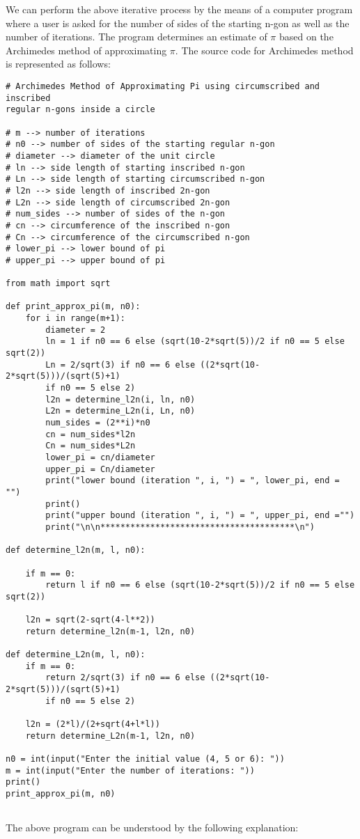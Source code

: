\documentclass[12pt]{article}
\begin{document}
We can perform the above iterative process by the means of a
computer program where a user is asked for the number of sides of the starting n-gon as well as the number of iterations. The program determines an
estimate of $\pi$ based on the Archimedes method of approximating $\pi$. The source
code for Archimedes method is represented as follows:

\begin{verbatim}
# Archimedes Method of Approximating Pi using circumscribed and inscribed
regular n-gons inside a circle

# m --> number of iterations
# n0 --> number of sides of the starting regular n-gon
# diameter --> diameter of the unit circle
# ln --> side length of starting inscribed n-gon
# Ln --> side length of starting circumscribed n-gon
# l2n --> side length of inscribed 2n-gon
# L2n --> side length of circumscribed 2n-gon
# num_sides --> number of sides of the n-gon
# cn --> circumference of the inscribed n-gon
# Cn --> circumference of the circumscribed n-gon
# lower_pi --> lower bound of pi
# upper_pi --> upper bound of pi

from math import sqrt

def print_approx_pi(m, n0):
    for i in range(m+1):
        diameter = 2
        ln = 1 if n0 == 6 else (sqrt(10-2*sqrt(5))/2 if n0 == 5 else sqrt(2))
        Ln = 2/sqrt(3) if n0 == 6 else ((2*sqrt(10-2*sqrt(5)))/(sqrt(5)+1)
        if n0 == 5 else 2)
        l2n = determine_l2n(i, ln, n0)
        L2n = determine_L2n(i, Ln, n0)
        num_sides = (2**i)*n0
        cn = num_sides*l2n
        Cn = num_sides*L2n
        lower_pi = cn/diameter
        upper_pi = Cn/diameter
        print("lower bound (iteration ", i, ") = ", lower_pi, end = "")
        print()
        print("upper bound (iteration ", i, ") = ", upper_pi, end ="")
        print("\n\n***************************************\n")
		
def determine_l2n(m, l, n0):

    if m == 0:
        return l if n0 == 6 else (sqrt(10-2*sqrt(5))/2 if n0 == 5 else sqrt(2))

    l2n = sqrt(2-sqrt(4-l**2))
    return determine_l2n(m-1, l2n, n0)
	
def determine_L2n(m, l, n0): 
    if m == 0:
        return 2/sqrt(3) if n0 == 6 else ((2*sqrt(10-2*sqrt(5)))/(sqrt(5)+1)
        if n0 == 5 else 2)
		
    l2n = (2*l)/(2+sqrt(4+l*l))
    return determine_L2n(m-1, l2n, n0)
	
n0 = int(input("Enter the initial value (4, 5 or 6): "))
m = int(input("Enter the number of iterations: "))
print()
print_approx_pi(m, n0)
	
\end{verbatim}
The above program can be understood by the following explanation:
\end{document}
